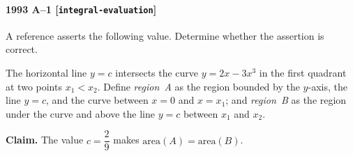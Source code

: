 \paragraph{1993 A--1 \textnormal{[\texttt{integral-evaluation}]}}
A reference asserts the following value. Determine whether the
assertion is correct.

The horizontal line $y = c$ intersects the curve $y = 2x - 3x^3$
in the first quadrant at two points $x_1 < x_2$. Define
\textsl{region~A} as the region bounded by the $y$-axis, the line
$y = c$, and the curve between $x = 0$ and $x = x_1$; and
\textsl{region~B} as the region under the curve and above the line
$y = c$ between $x_1$ and $x_2$.

\textbf{Claim.} The value $c = \dfrac{2}{9}$ makes
$\mathrm{area}(A) = \mathrm{area}(B)$.
